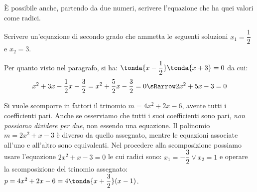 % 
% 
% 

È possibile anche, partendo da due numeri, scrivere l'equazione che ha quei 
valori come radici.

\begin{esempio}
Scrivere un'equazione di secondo grado che ammetta le seguenti soluzioni 
\(x_1 = \dfrac{1}{2}\) e \(x_2 = 3\).

Per quanto visto nel paragrafo, si ha: 
\(\tonda{x-\dfrac{1}{2} } \tonda{x +3 }=0\) da cui: 
\[x^2 +3 x-\dfrac{1}{2} x -\dfrac{3}{2} = 
x^2 +\dfrac{5}{2} x -\dfrac{3}{2} = 0 \sRarrow 2x^2 +5x -3 = 0\]
\end{esempio}

\osservazione
Si vuole scomporre in fattori il trinomio \(m = 4 x^2 +2 x -6\), avente 
tutti 
i coefficienti pari. Anche se osserviamo che tutti i suoi coefficienti sono 
pari, \emph{non possiamo dividere per due}, non essendo una equazione. Il 
polinomio \(m = 2 x^2 +x -3\) è diverso da quello assegnato, mentre le 
equazioni associate all'uno e all'altro sono equivalenti. Nel procedere alla 
scomposizione possiamo usare l'equazione \(2 x^2 +x -3 = 0\) le cui radici 
sono:
\(x_1 = -\dfrac{3}{2} \vee x_2 = 1\) e operare la scomposizione del 
trinomio 
assegnato: \(p = 4 x^2 +2 x -6 = 4 \tonda{x +\dfrac{3}{2} } ( x -
1)\).

